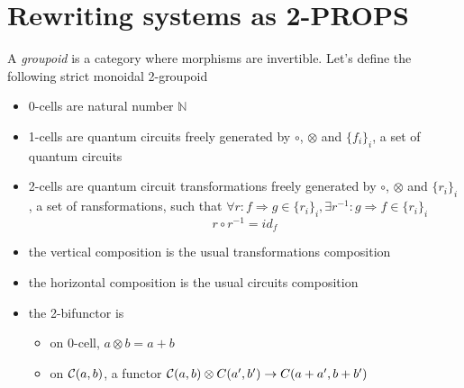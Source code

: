 \documentclass[a4paper]{article}
\begin{document}
\section{Rewriting systems as 2-PROPS}
\label{sec:rewriting}

\begin{definition}
A \emph{groupoid} is a category where morphisms are invertible.
Let's define the following strict monoidal 2-groupoid \catC

\begin{itemize}
\item 0-cells are natural number $\mathbb{N}$
\item 1-cells are quantum circuits freely generated by $\circ$, $\otimes$ and $\{f_i\}_i$, a set of quantum circuits
\item 2-cells are quantum circuit transformations freely generated by $\circ$, $\otimes$ and $\{r_i\}_i$, a set of ransformations, such that $\forall r: f \Rightarrow g \in \{r_i\}_i, \exists r^{-1}: g \Rightarrow f \in \{r_i\}_i$
\[
r \circ r^{-1} = id_f
\]
\item the vertical composition is the usual transformations composition
\item the horizontal composition is the usual circuits composition
\item the 2-bifunctor is
\begin{itemize}
\item on 0-cell, $a \otimes b = a + b$
\item on ${\cal C}(a, b)$, a functor ${\cal C}(a, b) \otimes C(a', b') \to C(a + a', b + b')$
\end{itemize}
\end{itemize}
\end{definition}
\end{document}
